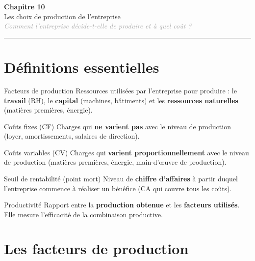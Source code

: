 \documentclass[11pt,a4paper]{article}
\begin{document}
\begin{center}
  {\Large\bfseries\textcolor{mainColor}{Chapitre 10}}\\[2pt]
  {\large Les choix de production de l'entreprise}\\[4pt]
  \textit{\textcolor{darkGray}{Comment l'entreprise décide-t-elle de produire et à quel coût ?}}
\end{center}
\vspace{4pt}\hrule\vspace{8pt}

\section*{Définitions essentielles}

\begin{defbox}{Facteurs de production}
Ressources utilisées par l'entreprise pour produire : le \textbf{travail} (RH), le \textbf{capital} (machines, bâtiments) et les \textbf{ressources naturelles} (matières premières, énergie).
\end{defbox}

\vspace{4pt}
\begin{defbox}{Coûts fixes (CF)}
Charges qui \textbf{ne varient pas} avec le niveau de production (loyer, amortissements, salaires de direction).
\end{defbox}

\vspace{4pt}
\begin{defbox}{Coûts variables (CV)}
Charges qui \textbf{varient proportionnellement} avec le niveau de production (matières premières, énergie, main-d'œuvre de production).
\end{defbox}

\vspace{4pt}
\begin{defbox}{Seuil de rentabilité (point mort)}
Niveau de \textbf{chiffre d'affaires} à partir duquel l'entreprise commence à réaliser un bénéfice (CA qui couvre tous les coûts).
\end{defbox}

\vspace{4pt}
\begin{defbox}{Productivité}
Rapport entre la \textbf{production obtenue} et les \textbf{facteurs utilisés}. Elle mesure l'efficacité de la combinaison productive.
\end{defbox}

\section*{Les facteurs de production}
\end{document}
